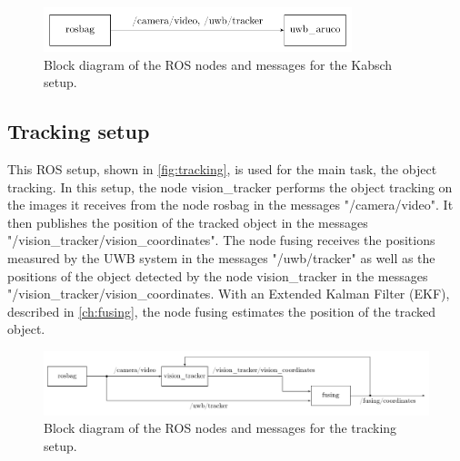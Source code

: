 \begin{figure}[h]\centering
	\includegraphics[width=0.8\textwidth]{figures/blockdiagram_kabsch}
	\caption{Block diagram of the ROS nodes and messages for the Kabsch setup.}\label{fig:kabsch}
\end{figure}

\subsection{Tracking setup}\label{subsec:tracking}
This ROS setup, shown in \autoref{fig:tracking}, is used for the main task, the object tracking. In this setup, the node vision\_tracker performs the object tracking on the images it receives from the node rosbag in the messages "/camera/video". It then publishes the position of the tracked object in the messages "/vision\_tracker/vision\_coordinates". The node fusing receives the positions measured by the UWB system in the messages "/uwb/tracker" as well as the positions of the object detected by the node vision\_tracker in the messages "/vision\_tracker/vision\_coordinates. With an Extended Kalman Filter (EKF), described in \autoref{ch:fusing}, the node fusing estimates the position of the tracked object.

\begin{figure}[h]\centering
	\includegraphics[width=1.0\textwidth]{figures/blockdiagram_tracking}
	\caption{Block diagram of the ROS nodes and messages for the tracking setup.}\label{fig:tracking}
\end{figure}
